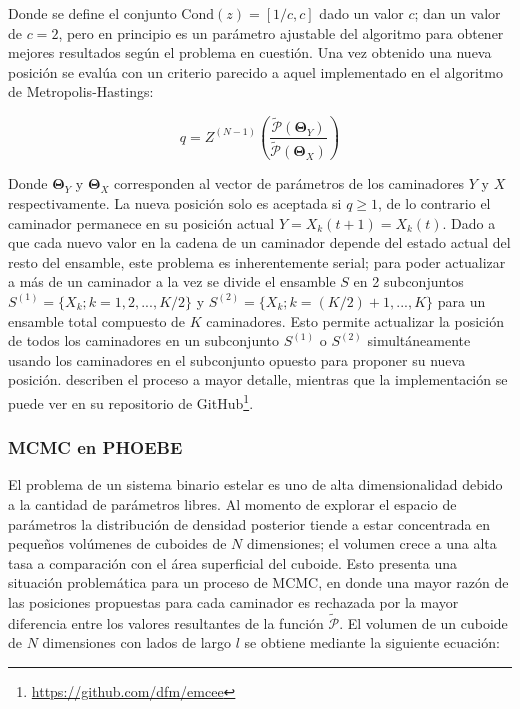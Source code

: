 Donde se define el conjunto $\mathrm{Cond}(z) = [1/c, c]$ dado un valor $c$;
dan un valor de $c = 2$, pero en principio es un parámetro ajustable del
algoritmo para obtener mejores resultados según el problema en cuestión. Una vez
obtenido una nueva posición se evalúa con un criterio parecido a aquel
implementado en el algoritmo de Metropolis-Hastings:

\begin{eqfloat}[!ht]
	\centering
	\begin{equation}
		q = Z^{(N - 1)} \left(\frac{\tilde{\mathcal{P}}(\mathbf{\Theta}_Y)}{\tilde{\mathcal{P}}(\mathbf{\Theta}_X)}\right)
	\end{equation}
\end{eqfloat}

Donde $\mathbf{\Theta}_Y$ y $\mathbf{\Theta}_X$ corresponden al vector de
parámetros de los caminadores $Y$ y $X$ respectivamente. La nueva posición solo
es aceptada si $q \geq 1$, de lo contrario el caminador permanece en su posición
actual $Y = X_{k}(t + 1) = X_{k}(t)$. Dado a que cada nuevo valor en la cadena
de un caminador depende del estado actual del resto del ensamble, este problema
es inherentemente serial; para poder actualizar a más de un caminador a la vez
se divide el ensamble $S$ en 2 subconjuntos $S^{(1)} = \{ X_k; k = 1, 2, ...,
K/2 \}$ y $S^{(2)} = \{ X_k; k = (K/2) + 1, ..., K \}$ para un ensamble total
compuesto de $K$ caminadores. Esto permite actualizar la posición de todos los
caminadores en un subconjunto $S^{(1)}$ o $S^{(2)}$ simultáneamente usando los
caminadores en el subconjunto opuesto para proponer su nueva posición.
 describen el proceso a mayor detalle,
mientras que la implementación se puede ver en su repositorio de
GitHub\footnote{\url{https://github.com/dfm/emcee}}.

\subsubsection{MCMC en PHOEBE}

El problema de un sistema binario estelar es uno de alta dimensionalidad debido
a la cantidad de parámetros libres. Al momento de explorar el espacio de
parámetros la distribución de densidad posterior tiende a estar concentrada en
pequeños volúmenes de cuboides de $N$ dimensiones; el volumen crece a una alta
tasa a comparación con el área superficial del cuboide. Esto presenta una
situación problemática para un proceso de MCMC, en donde una mayor razón de las
posiciones propuestas para cada caminador es rechazada por la mayor diferencia
entre los valores resultantes de la función $\tilde{\mathcal{P}}$. El volumen de
un cuboide de $N$ dimensiones con lados de largo $l$ se obtiene mediante la
siguiente ecuación:

